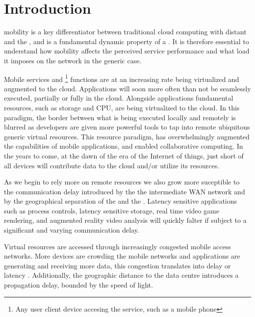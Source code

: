 \section{Introduction}
\Ue{} mobility is a key differentiator between traditional cloud computing with distant \dcs{} and the \xcloud{}, and is a fundamental dynamic property of a \xcloud{}. It is therefore essential to understand how \ue{} mobility affects the perceived service performance and what load it imposes on the network in the generic case.

Mobile services and \ue{} \footnote{Any user client device accesing the service, such as a mobile phone} functions are at an increasing rate being virtualized and augmented to the cloud. Applications will soon more often than not be seamlessly executed, partially or fully in the cloud. Alongside applications fundamental \ue{} resources, such as storage and CPU, are being virtualized to the cloud. In this paradigm, the border between what is being executed locally and remotely is blurred as developers are given more powerful tools to tap into remote ubiquitous generic virtual resources. This resource paradigm, has overwhelmingly augmented the capabilities of mobile applications, and enabled collaborative computing. In the years to come, at the dawn of the era of the Internet of things, just short of all devices will contribute data to the cloud and/or utilize its resources.


As we begin to rely more on remote resources we also grow more suceptible to the communication delay introduced by the the intermediate WAN network and by the geographical separation of the \ue{} and the \dc{} \cite{choi2007analysis}. Latency sensitive applications such as process controls, latency sensitive storage, real time video game rendering, and augmented reality video analysis will quickly falter if subject to a significant and varying communication delay.

Virtual resources are accessed through increasingly congested mobile access networks. More devices are crowding the mobile networks and applications are generating and receiving more data, this congestion translates into delay or latency \cite{hu2005measurement}. Additionally, the geographic distance to the data centre introduces a propagation delay, bounded by the speed of light.

